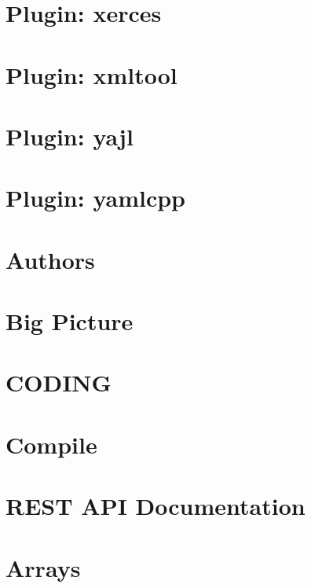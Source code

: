\documentclass[twoside]{book}
\newcommand{\+}{\discretionary{\mbox{\scriptsize$\hookleftarrow$}}{}{}}
\begin{document}
\chapter{Plugin\+: xerces}
\label{md_src_plugins_xerces_README}

\chapter{Plugin\+: xmltool}
\label{md_src_plugins_xmltool_README}

\chapter{Plugin\+: yajl}
\label{md_src_plugins_yajl_README}

\chapter{Plugin\+: yamlcpp}
\label{md_src_plugins_yamlcpp_README}

\chapter{Authors}
\label{doc_AUTHORS_md}

\chapter{Big Picture}
\label{doc_BIGPICTURE_md}

\chapter{C\+O\+D\+I\+NG}
\label{doc_CODING_md}

\chapter{Compile}
\label{doc_COMPILE_md}

\chapter{R\+E\+ST A\+PI Documentation}
\label{doc_decisions_api_documentation_md}

\chapter{Arrays}
\label{doc_decisions_array_md}

\end{document}
